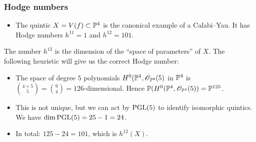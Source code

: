 \documentclass[UKenglish]{beamer}
\begin{document}
\begin{frame}
\begin{textblock}{0.4}
    \end{textblock}

\end{frame}

\begin{frame}
\frametitle{Hodge numbers}

\begin{itemize}
	\item The quintic $X=V(f) \subset \P^4$ is the canonical example of a Calabi--Yau. It has Hodge numbers $h^{11}=1$ and $h^{12}=101$.
\end{itemize}

\begin{remark}[Heuristic]
The number $h^{12}$ is the dimension of the ``space of parameters'' of $X$. The following heuristic will give us the correct Hodge number:
\begin{itemize}
	\item The space of degree $5$ polynomials $H^0(\P^4,\OO_{\P^4}(5)$ in $\P^4$ is $\binom{4+5}{5}=\binom{9}{4}=126$-dimensional. Hence $\P(H^0(\P^4,\OO_{\P^4}(5)) = \P^{125}$.
	\item This is not unique, but we can act by $\PGL(5)$ to identify isomorphic quintics. We have $\dim \PGL(5)=25-1=24$.
	\item In total: $125-24=101$, which is $h^{12}(X)$.
\end{itemize}
\end{remark}

\end{frame}
\end{document}
